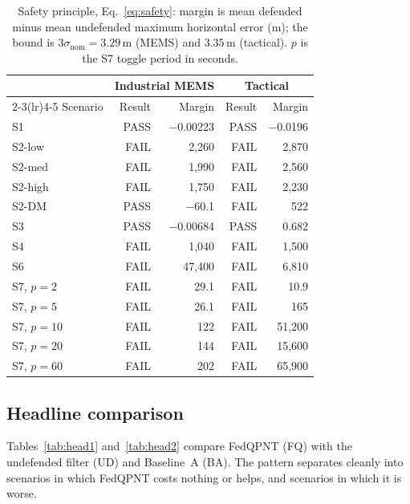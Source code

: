 \documentclass[journal]{IEEEtran}
\begin{document}
\begin{table}[t]
\centering
\caption{Safety principle, Eq.~\eqref{eq:safety}: margin is mean defended minus mean undefended maximum horizontal error (m); the bound is $3\sigma_{\mathrm{nom}} = 3.29$\,m (MEMS) and $3.35$\,m (tactical). $p$ is the S7 toggle period in seconds.}
\label{tab:safety}
\scriptsize
\begin{tabular}{lrrrr}
\toprule
 & \multicolumn{2}{c}{Industrial MEMS} & \multicolumn{2}{c}{Tactical} \\
\cmidrule(lr){2-3}\cmidrule(lr){4-5}
Scenario & Result & Margin & Result & Margin \\
\midrule
S1 & PASS & $-$0.00223 & PASS & $-$0.0196 \\
S2-low & FAIL & 2{,}260 & FAIL & 2{,}870 \\
S2-med & FAIL & 1{,}990 & FAIL & 2{,}560 \\
S2-high & FAIL & 1{,}750 & FAIL & 2{,}230 \\
S2-DM & PASS & $-$60.1 & FAIL & 522 \\
S3 & PASS & $-$0.00684 & PASS & 0.682 \\
S4 & FAIL & 1{,}040 & FAIL & 1{,}500 \\
S6 & FAIL & 47{,}400 & FAIL & 6{,}810 \\
S7, $p{=}2$ & FAIL & 29.1 & FAIL & 10.9 \\
S7, $p{=}5$ & FAIL & 26.1 & FAIL & 165 \\
S7, $p{=}10$ & FAIL & 122 & FAIL & 51{,}200 \\
S7, $p{=}20$ & FAIL & 144 & FAIL & 15{,}600 \\
S7, $p{=}60$ & FAIL & 202 & FAIL & 65{,}900 \\
\bottomrule
\end{tabular}
\end{table}

\subsection{Headline comparison}
Tables~\ref{tab:head1} and~\ref{tab:head2} compare FedQPNT (FQ) with the undefended filter (UD) and Baseline~A (BA). The pattern separates cleanly into scenarios in which FedQPNT costs nothing or helps, and scenarios in which it is worse.
\end{document}
